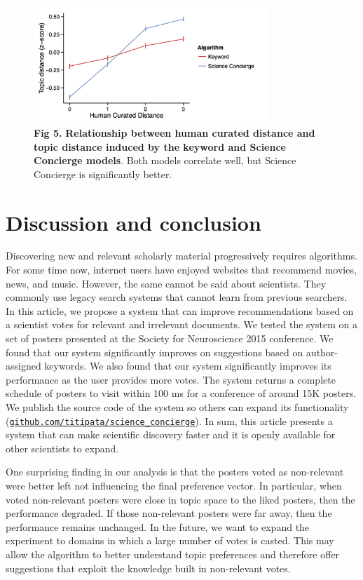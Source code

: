 \documentclass[a4paper]{article}
\begin{document}
\begin{figure}[!ht]
\centering
\includegraphics[width=3.5in]{human_vs_topic_distance}
\caption*{\textbf{Fig 5.} \textbf{Relationship between human curated distance and topic distance induced by the keyword and Science Concierge models}. Both models correlate well, but Science Concierge is significantly better.}
\end{figure}


\section{Discussion and conclusion}

Discovering new and relevant scholarly material progressively requires algorithms. For some time now, internet users have enjoyed websites that recommend movies, news, and music. However, the same cannot be said about scientists. They commonly use legacy search systems that cannot learn from previous searchers. In this article, we propose a system that can improve recommendations based on a scientist votes for relevant and irrelevant documents. We tested the system on a set of posters presented at the Society for Neuroscience 2015 conference. We found that our system significantly improves on suggestions based on author-assigned keywords. We also found that our system significantly improves its performance as the user provides more votes. The system returns a complete schedule of posters to visit within 100 ms for a conference of around 15K posters. We publish the source code of the system so others can expand its functionality (\href{https://github.com/titipata/science_concierge}{\texttt{github.com/titipata/science\_concierge}}). In sum, this article presents a system that can make scientific discovery faster and it is openly available for other scientists to expand.


One surprising finding in our analysis is that the posters voted as non-relevant were better left not influencing the final preference vector. In particular, when voted non-relevant posters were close in topic space to the liked posters, then the performance degraded. If those non-relevant posters were far away, then the performance remains unchanged. In the future, we want to expand the experiment to domains in which a large number of votes is casted. This may allow the algorithm to better understand topic preferences and therefore offer suggestions that exploit the knowledge built in non-relevant votes.
\end{document}
